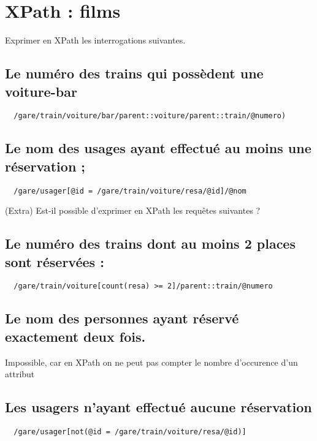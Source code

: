 \chapter{XPath : films}

Exprimer en XPath les interrogations suivantes.

\section{Le numéro des trains qui possèdent une voiture-bar}
\begin{verbatim}
  /gare/train/voiture/bar/parent::voiture/parent::train/@numero)
\end{verbatim}

\section{Le nom des usages ayant effectué au moins une réservation ;}
\begin{verbatim}
  /gare/usager[@id = /gare/train/voiture/resa/@id]/@nom
\end{verbatim}

(Extra) Est-il possible d’exprimer en XPath les requêtes suivantes ?

\section{Le numéro des trains dont au moins 2 places sont réservées :}
\begin{verbatim}
  /gare/train/voiture[count(resa) >= 2]/parent::train/@numero
\end{verbatim}


\section{Le nom des personnes ayant réservé exactement deux fois.}
Impossible, car en XPath on ne peut pas compter le nombre d'occurence d'un attribut

\section{Les usagers n’ayant effectué aucune réservation}
\begin{verbatim}
  /gare/usager[not(@id = /gare/train/voiture/resa/@id)]
\end{verbatim}
